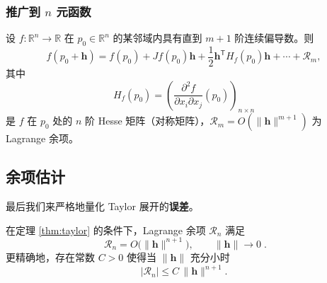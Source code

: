 \documentclass[lang=cn,11pt]{elegantbook}
\begin{document}
\subsubsection*{推广到 $n$ 元函数}

\begin{property} \label{prop:taylor-nvar}
设 $f:\mathbb R^n\to\mathbb R$ 在 $p_0\in\mathbb R^n$ 的某邻域内具有直到 $m+1$ 阶连续偏导数。则
\[
f(p_0+\boldsymbol h) = f(p_0)+Jf(p_0)\boldsymbol h+\frac{1}{2}\boldsymbol h^{\mathsf T}H_f(p_0)\boldsymbol h + \cdots + \mathcal R_m,
\]
其中
\[
H_f(p_0)=\left( \frac{\partial^2 f}{\partial x_i\partial x_j}(p_0) \right)_{n\times n}
\]
是 $f$ 在 $p_0$ 处的 $n$ 阶 Hesse 矩阵（对称矩阵），$\mathcal R_m=O(\|\boldsymbol h\|^{m+1})$ 为 Lagrange 余项。
\end{property}


\subsection{余项估计}

最后我们来严格地量化 Taylor 展开的\textbf{误差}。

\begin{property}[余项的量级估计] \label{prop:remainder-bound}
在定理 \ref{thm:taylor} 的条件下，Lagrange 余项 $\mathcal R_n$ 满足
\[
\boxed{\;\mathcal R_n=O\bigl(\|\boldsymbol h\|^{n+1}\bigr),\qquad \|\boldsymbol h\|\to 0\;}.
\]
更精确地，存在常数 $C>0$ 使得当 $\|\boldsymbol h\|$ 充分小时
\[
|\mathcal R_n|\leq C\,\|\boldsymbol h\|^{n+1}.
\]
\end{property}
\end{document}
